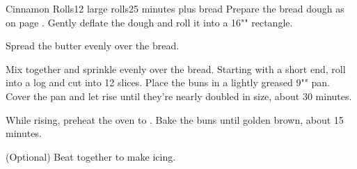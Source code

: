 \documentclass[../Cookbook.tex]{subfiles}
\begin{document}
\begin{recipe}[CinnamonRolls]{Cinnamon Rolls}{12 large rolls}{25 minutes plus bread}
	Prepare the bread dough as on page \pageref{BaseDessertBread}.
	Gently deflate the dough and roll it into a 16"" rectangle.

	Spread the butter evenly over the bread.

	Mix together and sprinkle evenly over the bread.
	Starting with a short end, roll into a log and cut into 12 slices.
	Place the buns in a lightly greased 9"" pan.
	Cover the pan and let rise until they're nearly doubled in size, about 30 minutes.

	While rising, preheat the oven to .
	Bake the buns until golden brown, about 15 minutes.

	(Optional) Beat together to make icing.
\end{recipe}
\end{document}
